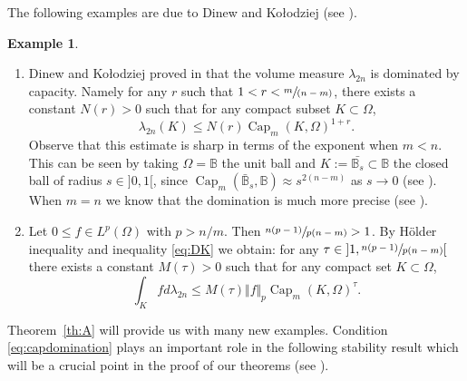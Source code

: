 \documentclass[JEP,XML,SOM,Unicode]{cedram}
\newcommand{\spfrac}[2]{\sfrac{#1}{(#2)}}
\theoremstyle{definition}
\newtheorem{example}[theorem]{Example}
\newcommand{\B}{\mathbb{B}}
\DeclareMathOperator{\Capa}{Cap}
\begin{document}
The following examples are due to Dinew and Ko\l odziej (see \cite{DK14}).
\skpt
\begin{example}
\begin{enumerate}
\item
Dinew and Ko\l odziej proved in \cite{DK14} that the volume measure $\lambda_{2 n}$ is dominated by capacity. Namely for any $r$ such that $1 < r < \spfrac{m}{n - m}$, there exists a constant $N (r) > 0$ such that for any compact subset $K \subset \Omega$,
\begin{equation} \label{eq:DK}
\lambda_{2 n} (K) \leq N (r) \Capa_m (K,\Omega)^{1+ r}.
\end{equation}
Observe that this estimate is sharp in terms of the exponent when $m < n$. This can be seen by taking $\Omega = \B$ the unit ball and $K:= \bar{\B_s} \subset \B$ the closed ball of radius $s \in{}]0,1[$, since $\Capa_m(\bar{\B}_s,\B) \approx s^{2 (n-m)}$ as $s \to 0$ (see \cite{Lu12}).
When $m=n$ we know that the domination is much more precise (see \cite{ACKPZ09}).

\item
Let $ 0 \leq f \in L^p (\Omega)$ with $p > n \slash m$. Then $ \sfrac{n (p-1)}{p (n - m)} > 1$. By Hölder inequality and inequality \eqref{eq:DK} we obtain: for any $\tau\in{}]1,\sfrac{n (p-1)}{p (n - m)}[$ there exists a constant $M (\tau) > 0$ such that for any compact set $K \subset \Omega$,
\begin{equation} \label{eq:DK2}
\int_K f d \lambda_{2 n} \leq M (\tau) \Vert f\Vert_p \Capa_m (K,\Omega)^{\tau}.
\end{equation}
\end{enumerate}
\end{example}

Theorem~\ref{th:A} will provide us with many new examples. Condition \eqref{eq:capdomination} plays an important role in the following stability result which will be a crucial point in the proof of our theorems (see \cite{EGZ09, GKZ08, Ch16}).
\end{document}
